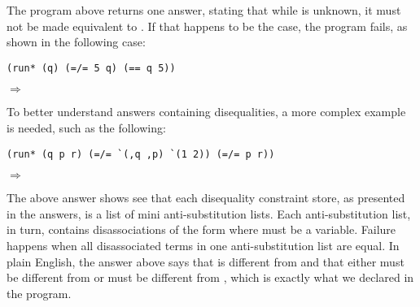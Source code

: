 The program above returns one answer, stating that while  is unknown, it must not be made equivalent to . If that happens to be the case, the program fails, as shown in the following case:
\begin{lstlisting}
(run* (q) (=/= 5 q) (== q 5))
\end{lstlisting}
$\Rightarrow$ \code{()}

To better understand answers containing disequalities, a more complex example is needed, such as the following:
\begin{lstlisting}
(run* (q p r) (=/= `(,q ,p) `(1 2)) (=/= p r))
\end{lstlisting}
$\Rightarrow$

The above answer shows see that each disequality constraint store, as presented in the answers, is a list of mini anti-substitution lists. Each anti-substitution list, in turn, contains disassociations of the form  where  must be a variable. Failure happens when all disassociated terms in one anti-substitution list are equal. In plain English, the answer above says that  is different from  and that either  must be different from  or  must be different from , which is exactly what we declared in the program.